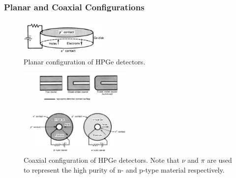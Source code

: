 \subsubsection{Planar and Coaxial Configurations}
\begin{figure}[ht]
    \centering
    \includegraphics[width=0.4\textwidth]{images/HPGe_planar_config.png}
    \caption{Planar configuration of HPGe detectors.}
    \label{fig:HPGe_planar_config}
\end{figure}
\begin{figure}[ht]
    \centering
    \includegraphics[width=0.5\textwidth]{images/HPGe_cylindrical_config.png}
    \caption{Coaxial configuration of HPGe detectors. Note that $\nu$ and $\pi$ are used to represent the high purity of n- and p-type material respectively.}
    \label{fig:HPGe_cylindrical_config}
\end{figure}
